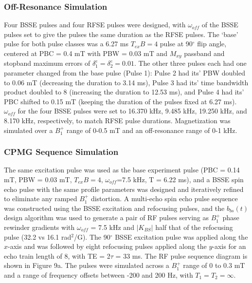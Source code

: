 \documentclass[a4paper,12pt]{article}
\newcommand{\bbst}{b_{bs}(t)}
\begin{document}
\subsubsection*{Off-Resonance Simulation}
Four BSSE pulses and four RFSE pulses were designed,
with $\omega_{off}$ of the BSSE pulses set to give the pulses the same duration as the RFSE pulses. 
The `base' pulse for both pulse classes was a 6.27 ms $T_{ex}B = 4$ pulse at 90$^\circ$ flip angle, 
centered at PBC = 0.4 mT with PBW = 0.03 mT and $M_{xy}$ passband and stopband maximum errors of 
$\delta_1^e = \delta_2^e = 0.01$.
The other three pulses each had one parameter changed from the base pulse (Pulse 1): 
Pulse 2 had its' PBW doubled to 0.06 mT (decreasing the duration to 3.14 ms), 
Pulse 3 had its' time bandwidth product doubled to 8 (increasing the duration to 12.53 ms),
and Pulse 4 had its' PBC shifted to 0.15 mT (keeping the duration of the pulses fixed at 6.27 ms). 
$\omega_{off}$ for the four BSSE pulses were set to 16.370 kHz, 9.485 kHz, 19.250 kHz, and 8.170 kHz, respectively,
to match RFSE pulse durations. 
Magnetization was simulated over a $B_1^+$ range of 0-0.5 mT and an off-resonance range of 0-1 kHz.

\subsubsection*{CPMG Sequence Simulation}
The same excitation pulse was used as the base experiment pulse (PBC = 0.14 mT, PBW = 0.03 mT, $T_{ex}B=4$, $\omega_{off}$=7.5 kHz, T = 6.22 ms), 
and a BSSE spin echo pulse with the same profile parameters was designed and iteratively refined to eliminate any ramped $B_1^+$ distortion.
A multi-echo spin echo pulse sequence was constructed using the BSSE excitation and refocusing pulses, 
and the $\bbst$ 
design algorithm was used to generate a pair of RF pulses serving as $B_1^+$ phase rewinder gradients with $\omega_{off}$ = 7.5 kHz and $|K_{BS}|$ half that of the refocusing pulse (32.2 vs 16.1 rad$^2$/G).
The 90$^\circ$ BSSE excitation pulse was applied along the $x$-axis and was followed by eight refocusing pulses applied along the $y$-axis for an echo train length of 8, with TE = 2$\tau$ = 33 ms. 
The RF pulse sequence diagram is shown in Figure 9a.
The pulses were simulated across a $B_1^+$ range of 0 to 0.3 mT and
a range of frequency offsets between -200 and 200 Hz, 
with $T_1 = T_2 = \infty$. 
\end{document}
